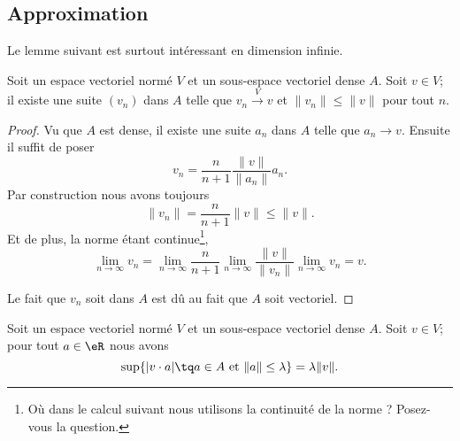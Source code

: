 \subsection{Approximation}

Le lemme suivant est surtout intéressant en dimension infinie.
\begin{lemma}
    Soit un espace vectoriel normé \( V\) et un sous-espace vectoriel dense \( A\). Soit \( v\in V\); il existe une suite \( (v_n)\) dans \( A\) telle que \( v_n\stackrel{V}{\longrightarrow}v\) et \( \| v_n \|\leq \| v \|\) pour tout \( n\).
\end{lemma}

\begin{proof}
    Vu que \( A\) est dense, il existe une suite \( a_n\) dans \( A\) telle que \( a_n\to v\). Ensuite il suffit de poser
    \begin{equation}
        v_n=\frac{ n }{ n+1 }\frac{ \| v \| }{ \| a_n \| }a_n.
    \end{equation}
    Par construction nous avons toujours
    \begin{equation}
        \| v_n \|=\frac{ n }{ n+1 }\| v \|\leq \| v \|.
    \end{equation}
    Et de plus, la norme étant continue\footnote{Où dans le calcul suivant nous utilisons la continuité de la norme ? Posez-vous la question.},
    \begin{equation}
        \lim_{n\to \infty} v_n=\lim_{n\to \infty} \frac{ n }{ n+1 }\lim_{n\to \infty} \frac{ \| v \| }{ \| v_n \| }\lim_{n\to \infty} v_n=v.
    \end{equation}

    Le fait que \( v_n\) soit dans \( A\) est dû au fait que \( A\) soit vectoriel.
\end{proof}

\begin{proposition}     \label{PROPooVEMGooYKhMFy}
    Soit un espace vectoriel normé \( V\) et un sous-espace vectoriel dense \( A\). Soit \( v\in V\); pour tout \( a\in \eR\) nous avons
    \begin{equation}
        \sup\{ | v\cdot a |\tq a\in A\text{ et }\| a \|\leq \lambda \}=\lambda\| v \|.
    \end{equation}
\end{proposition}

